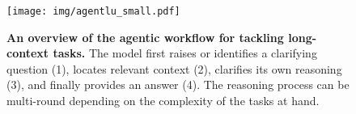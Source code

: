 \begin{figure}[t!]
    \begin{center}
    \texttt{[image: img/agentlu\_small.pdf]}
    \end{center}
    \caption{\textbf{An overview of the agentic workflow for tackling long-context tasks.} The model first raises or identifies a clarifying question (1), locates relevant context (2), clarifies its own reasoning (3), and finally provides an answer (4). The reasoning process can be multi-round depending on the complexity of the tasks at hand.
    }
    \label{fig:pipeline_small}
\end{figure}